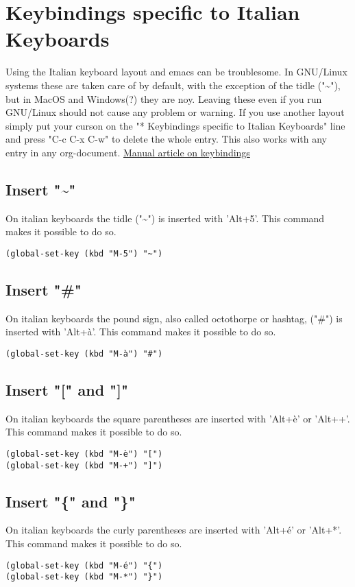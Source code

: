 \documentclass[11pt]{article}
\begin{document}
\section{Keybindings specific to Italian Keyboards}
\label{sec:org4c55aa7}
Using the Italian keyboard layout and emacs can be troublesome. 
In GNU/Linux systems these are taken care of by default, with the exception of the tidle ("\textasciitilde{}"),  but in MacOS and Windows(?) they are noy. 
Leaving these even if you run GNU/Linux should not cause any problem or warning.
If you use another layout simply put your curson on the "* Keybindings specific to Italian Keyboards" line and press "C-c C-x C-w" to delete the whole entry. This also works with any entry in any org-document.
\href{https://www.gnu.org/software/emacs/manual/html\_node/elisp/Key-Binding-Commands.html}{Manual article on keybindings}
\subsection{Insert "\textasciitilde{}"}
\label{sec:org34c17c1}
On italian keyboards the tidle ("\textasciitilde{}") is inserted with 'Alt+5'. This command makes it possible to do so.
\begin{verbatim}
(global-set-key (kbd "M-5") "~")
\end{verbatim}
\subsection{Insert "\#"}
\label{sec:org11cb40a}
On italian keyboards the pound sign, also called octothorpe or hashtag, ("\#") is inserted with 'Alt+à'. This command makes it possible to do so.
\begin{verbatim}
(global-set-key (kbd "M-à") "#")
\end{verbatim}
\subsection{Insert "[" and "]"}
\label{sec:orgb3ef9e5}
On italian keyboards the square parentheses are inserted with 'Alt+è' or 'Alt++'. This command makes it possible to do so.
\begin{verbatim}
(global-set-key (kbd "M-è") "[")
(global-set-key (kbd "M-+") "]")
\end{verbatim}
\subsection{Insert "\{" and "\}"}
\label{sec:org02740f1}
On italian keyboards the curly parentheses are inserted with 'Alt+é' or 'Alt+*'. This command makes it possible to do so.
\begin{verbatim}
(global-set-key (kbd "M-é") "{")
(global-set-key (kbd "M-*") "}")
\end{verbatim}
\end{document}
